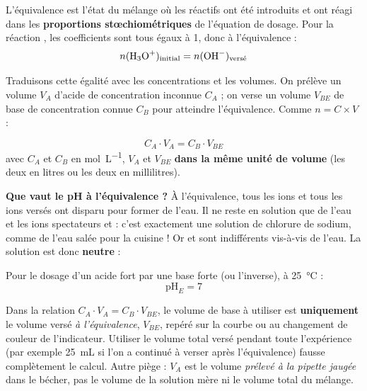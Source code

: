 \documentclass[11pt]{article}
\newcommand{\cle}[1]{{\popxbold\color{popdark}#1}}
\begin{document}
\begin{definition}
L'\cle{équivalence} est l'état du mélange où les réactifs ont été introduits et ont réagi dans les \textbf{proportions stœchiométriques} de l'équation de dosage. Pour la réaction , les coefficients sont tous égaux à 1, donc à l'équivalence :
\[ n(\ce{H3O+})_{\text{initial}} = n(\ce{OH-})_{\text{versé}} \]
\end{definition}

Traduisons cette égalité avec les concentrations et les volumes. On prélève un volume $V_A$ d'acide de concentration inconnue $C_A$ ; on verse un volume $V_{BE}$ de base de concentration connue $C_B$ pour atteindre l'équivalence. Comme $n = C \times V$ :

\begin{aretenir}
\[ \boxed{\; C_A \cdot V_A = C_B \cdot V_{BE} \;} \]
avec $C_A$ et $C_B$ en \si{mol.L^{-1}}, $V_A$ et $V_{BE}$ \textbf{dans la même unité de volume} (les deux en litres ou les deux en millilitres).
\end{aretenir}

\textbf{Que vaut le pH à l'équivalence ?} À l'équivalence, tous les ions  et tous les ions  versés ont disparu pour former de l'eau. Il ne reste en solution que de l'eau et les ions spectateurs  et  : c'est exactement une solution de chlorure de sodium, comme de l'eau salée pour la cuisine ! Or  et  sont indifférents vis-à-vis de l'eau. La solution est donc \textbf{neutre} :

\begin{propriete}
Pour le dosage d'un acide fort par une base forte (ou l'inverse), à \SI{25}{\celsius} :
\[ \mathrm{pH}_E = 7 \]
\end{propriete}

\begin{attention}
Dans la relation $C_A \cdot V_A = C_B \cdot V_{BE}$, le volume de base à utiliser est \textbf{uniquement} le volume versé \emph{à l'équivalence}, $V_{BE}$, repéré sur la courbe ou au changement de couleur de l'indicateur. Utiliser le volume total versé pendant toute l'expérience (par exemple \SI{25}{mL} si l'on a continué à verser après l'équivalence) fausse complètement le calcul. Autre piège : $V_A$ est le volume \emph{prélevé à la pipette jaugée} dans le bécher, pas le volume de la solution mère ni le volume total du mélange.
\end{attention}
\end{document}
